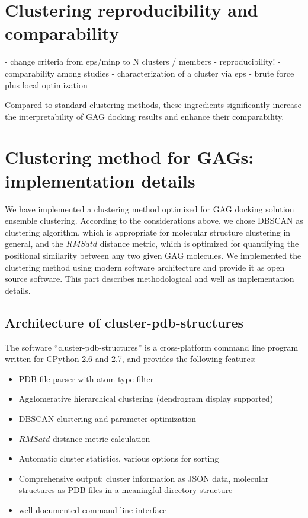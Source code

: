 \section{Clustering reproducibility and comparability}
\label{clustering_param_opt}

- change criteria from eps/minp to N clusters / members
- reproducibility!
- comparability among studies
- characterization of a cluster via eps
- brute force plus local optimization

Compared to standard clustering methods, these ingredients significantly
increase the interpretability of GAG docking results and enhance their
comparability.


\section{Clustering method for GAGs: implementation details}

We have implemented a clustering method optimized for GAG docking solution
ensemble clustering. According to the considerations above, we chose DBSCAN as
clustering algorithm, which is appropriate for molecular structure clustering in
general, and the $RMSatd$ distance metric, which is optimized for quantifying
the positional similarity between any two given GAG molecules. We implemented
the clustering method using modern software architecture and provide it as open
source software. This part describes methodological and well as implementation
details.

\subsection{Architecture of cluster-pdb-structures}

The software \enquote{cluster-pdb-structures} is a cross-platform command line
program written for CPython 2.6 and 2.7, and provides the following features:

\begin{itemize}
\item PDB file parser with atom type filter
\item Agglomerative hierarchical clustering (dendrogram display supported)
\item DBSCAN clustering and parameter optimization
\item $RMSatd$ distance metric calculation
\item Automatic cluster statistics, various options for sorting
\item Comprehensive output: cluster information as JSON data, molecular
structures as PDB files in a meaningful directory structure
\item well-documented command line interface
\end{itemize}


